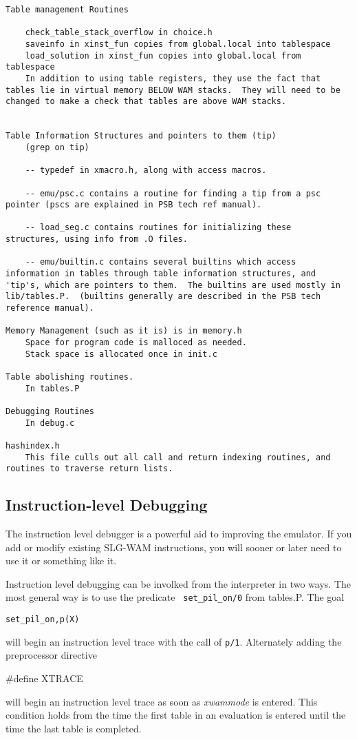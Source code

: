 \documentclass[11pt]{article}
\begin{document}
\begin{verbatim}
Table management Routines
	
	check_table_stack_overflow in choice.h
	saveinfo in xinst_fun copies from global.local into tablespace
	load_solution in xinst_fun copies into global.local from tablespace
	In addition to using table registers, they use the fact that
tables lie in virtual memory BELOW WAM stacks.  They will need to be
changed to make a check that tables are above WAM stacks.
	

Table Information Structures and pointers to them (tip)
	(grep on tip)

	-- typedef in xmacro.h, along with access macros.

	-- emu/psc.c contains a routine for finding a tip from a psc
pointer (pscs are explained in PSB tech ref manual).

	-- load_seg.c contains routines for initializing these
structures, using info from .O files.

	-- emu/builtin.c contains several builtins which access
information in tables through table information structures, and
'tip's, which are pointers to them.  The builtins are used mostly in
lib/tables.P.  (builtins generally are described in the PSB tech
reference manual).

Memory Management (such as it is) is in memory.h
	Space for program code is malloced as needed.
	Stack space is allocated once in init.c

Table abolishing routines.
	In tables.P

Debugging Routines
	In debug.c

hashindex.h
	This file culls out all call and return indexing routines, and
routines to traverse return lists.

\end{verbatim}

\subsection{Instruction-level Debugging}

The instruction level debugger is a powerful aid to improving the
emulator.  If you add or modify existing SLG-WAM instructions, you
will sooner or later need to use it or something like it.

Instruction level debugging can be involked from the interpreter in
two ways.  The most general way is to use the predicate {\tt
set\_pil\_on/0} from tables.P.  The goal
\begin{center} 
{\tt set\_pil\_on,p(X) }
\end{center}
will begin an instruction level trace with the call of {\tt p/1}.
Alternately adding the preprocessor directive
\begin{center}
\#define XTRACE
\end{center}
will begin an instruction level trace as soon as {\em xwammode} is
entered.  This condition holds from the time the first table in an
evaluation is entered until the time the last table is completed.
\end{document}
